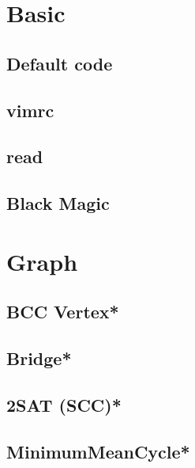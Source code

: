 \section{Basic}
%
\subsection{Default code}

\subsection{vimrc}

\subsection{read}

\subsection{Black Magic}

%


\section{Graph}
\subsection{BCC Vertex*} %

\subsection{Bridge*} %

\subsection{2SAT (SCC)*} %

\subsection{MinimumMeanCycle*} %

